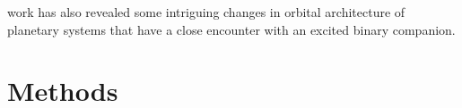 \documentclass{aastex631}
\begin{document}
work has also revealed some intriguing changes in orbital architecture of planetary systems that have a close encounter with an excited binary companion.
\section{Methods}
\end{document}
